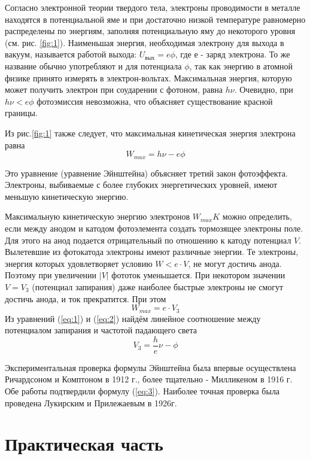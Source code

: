 Согласно электронной теории твердого тела, электроны проводимости в металле находятся в потенциальной яме и при достаточно низкой температуре равномерно распределены по энергиям, заполняя потенциальную яму до некоторого уровня (см. рис. \ref{fig:1}).
Наименьшая энергия, необходимая электрону для выхода в вакуум, называется работой выхода: $U_{\text{вых}} = e\phi$, где $е$ - заряд электрона. То же название обычно употребляют и для потенциала $\phi$, так как энергию в атомной физике принято измерять в электрон-вольтах. Максимальная энергия, которую может получить электрон при соударении с фотоном, равна $h \nu$. Очевидно, при $h \nu<e\phi$ фотоэмиссия невозможна, что объясняет существование красной границы.

Из рис.\ref{fig:1} также следует, что максимальная кинетическая энергия электрона равна
\begin{equation}
	\label{eq:1}
 	W_{max}=h \nu -e\phi
 \end{equation} 

Это уравнение (уравнение Эйнштейна) объясняет третий закон
фотоэффекта. Электроны, выбиваемые с более глубоких энергетических уровней, имеют меньшую кинетическую энергию.

Максимальную кинетическую энергию электронов $W_{max}K$ можно определить, если между анодом и катодом фотоэлемента создать тормозящее электроны поле. Для этого на анод подается отрицательный по отношению к катоду потенциал $V$. Вылетевшие из фотокатода электроны имеют различные энергии. Те электроны, энергия которых удовлетворяет условию $W < e\cdot V$, не могут достичь анода. Поэтому при увеличении $ |V|$ фототок уменьшается. При некотором значении $V = V_{3}$ (потенциал запирания) даже наиболее быстрые электроны не смогут достичь анода, и ток прекратится. При этом
\begin{equation}
	\label{eq:2}
	W_{max}=e\cdot V_{3}
\end{equation}
Из уравнений (\ref{eq:1}) и (\ref{eq:2}) найдём линейное соотношение между потенциалом запирания и частотой падающего света
\begin{equation}
	\label{eq:3}
	V_{3}=\frac he \nu-\phi
\end{equation}

Экспериментальная проверка формулы Эйнштейна была впервые осуществлена Ричардсоном и Комптоном в 1912 г., более тщательно - Милликеном в 1916 г. Обе работы подтвердили формулу (\ref{eq:3}). Наиболее точная проверка была проведена Лукирским и Прилежаевым в 1926г.

\section{Практическая часть}
